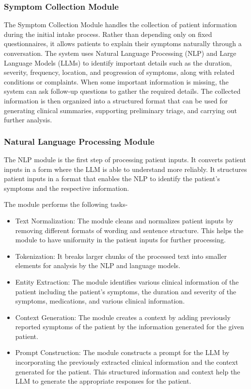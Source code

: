 \documentclass[conference]{IEEEtran}
\begin{document}
\subsubsection{Symptom Collection Module}

The Symptom Collection Module handles the collection of patient information during the initial intake process. Rather than depending only on fixed questionnaires, it allows patients to explain their symptoms naturally through a conversation. The system uses Natural Language Processing (NLP) and Large Language Models (LLMs) to identify important details such as the duration, severity, frequency, location, and progression of symptoms, along with related conditions or complaints. When some important information is missing, the system can ask follow-up questions to gather the required details. The collected information is then organized into a structured format that can be used for generating clinical summaries, supporting preliminary triage, and carrying out further analysis.

\subsubsection{Natural Language Processing Module}

 The NLP module is the first step of processing patient inputs. It converts patient inputs in a form where the LLM is able to understand more reliably. It structures patient inputs in a format that enables the NLP to identify the patient’s symptoms and the respective information.

 The module performs the following tasks-

 \begin{itemize}
  \item Text Normalization: The module cleans and normalizes patient inputs by removing different formats of wording and sentence structure. This helps the module to have uniformity in the patient inputs for further processing.
  \item Tokenization: It breaks larger chunks of the processed text into smaller elements for analysis by the NLP and language models.
  \item Entity Extraction: The module identifies various clinical information of the patient including the patient’s symptoms, the duration and severity of the symptoms, medications, and various clinical information.
  \item Context Generation: The module creates a context by adding previously reported symptoms of the patient by the information generated for the given patient.
  \item Prompt Construction: The module constructs a prompt for the LLM by incorporating the previously extracted clinical information and the context generated for the patient. This structured information and context help the LLM to generate the appropriate responses for the patient.
 \end{itemize}
\end{document}
